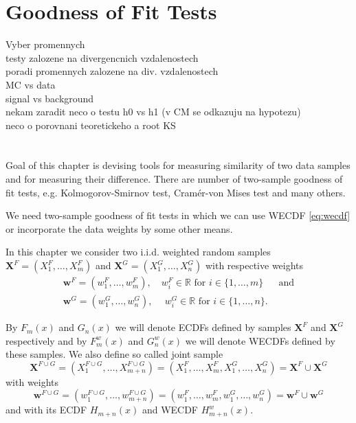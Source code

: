 \chapter{Goodness of Fit Tests}
\label{ch:GoF}

Vyber promennych \\
testy zalozene na divergencnich vzdalenostech \\
poradi promennych zalozene na div. vzdalenostech\\
 MC vs data\\
signal vs background \\
nekam zaradit neco o testu h0 vs h1 (v CM se odkazuju na hypotezu) \\
neco o porovnani teoretickeho a root KS \\
\\
\\



\noindent Goal of this chapter is devising tools for measuring similarity of two data samples and for measuring their difference. There are number of two-sample goodness of fit  tests, e.g. Kolmogorov-Smirnov test, Cram\'{e}r-von Mises test and many others. 

We need two-sample goodness of fit  tests in which we can use WECDF \ref{eq:wecdf} or incorporate the data weights by some other means.

In this chapter we consider two i.i.d. weighted random samples $\mathbf{X}^F = (X^F_1,\ldots, X^F_m)$ and $\mathbf{X}^G = (X^G_1, \ldots, X^G_n)$ with respective weights 
\begin{align*}
\mathbf{w}^F = (w^F_1,\ldots, w^F_m), \quad w_i^F \in \mathbb{R} \text{ for }  i \in \lbrace 1, \ldots, m \rbrace &\text{ and} \\
\mathbf{w}^G = (w^G_1,\ldots, w^G_n), \:
\quad w_i^G \in \mathbb{R} \text{ for } i \in \lbrace 1, \ldots, n \rbrace. &
\end{align*}

By $F_m(x) $ and $ G_n(x)$ we will denote ECDFs defined by samples $\mathbf{X}^F$ and $\mathbf{X}^G$ respectively and by $F^w_m(x)$ and $ G^w_n(x)$ we will denote WECDFs defined by these samples. We also define so called joint sample 
\begin{equation}
\mathbf{X}^{F\cup G} = (X^{F\cup G}_1, \ldots, X^{F\cup G}_{m+n}) = (X^{F}_1, \ldots, X^{F}_{m},X^G_1,\ldots, X^G_n) = \mathbf{X}^{F} \cup \mathbf{X}^{G}
\end{equation}
with weights 
\begin{equation}
\mathbf{w}^{F\cup G} = (w^{F\cup G}_1,\ldots, w^{F\cup G}_{m+n}) = (w^{F}_1,\ldots, w^{F}_{m},w^{G}_1,\ldots, w^{G}_{n}) = \mathbf{w}^{F} \cup \mathbf{w}^{G}
\end{equation}
and with its ECDF $H_{m+n}(x)$ and WECDF $H^w_{m+n}(x)$.

